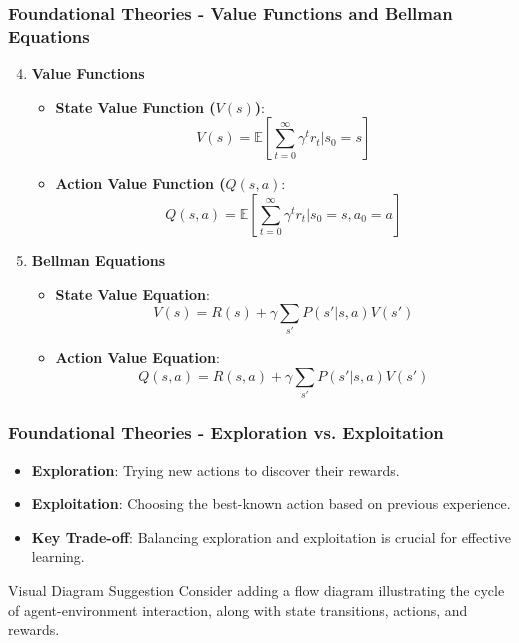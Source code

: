 \documentclass[aspectratio=169]{beamer}
\begin{document}
\begin{frame}[fragile]
    \frametitle{Foundational Theories - Value Functions and Bellman Equations}
    \begin{enumerate}
        \setcounter{enumi}{3}
        \item \textbf{Value Functions}
        \begin{itemize}
            \item \textbf{State Value Function (\(V(s)\))}:
            \[
            V(s) = \mathbb{E} \left[ \sum_{t=0}^{\infty} \gamma^t r_t | s_0 = s \right]
            \]
            \item \textbf{Action Value Function (\(Q(s, a)\)}:
            \[
            Q(s, a) = \mathbb{E} \left[ \sum_{t=0}^{\infty} \gamma^t r_t | s_0 = s, a_0 = a \right]
            \]
        \end{itemize}

        \item \textbf{Bellman Equations}
        \begin{itemize}
            \item \textbf{State Value Equation}:
            \[
            V(s) = R(s) + \gamma \sum_{s'} P(s' | s, a)V(s')
            \]
            \item \textbf{Action Value Equation}:
            \[
            Q(s, a) = R(s, a) + \gamma \sum_{s'} P(s' | s, a)V(s')
            \]
        \end{itemize}
    \end{enumerate}
\end{frame}

\begin{frame}[fragile]
    \frametitle{Foundational Theories - Exploration vs. Exploitation}
    \begin{itemize}
        \item \textbf{Exploration}: Trying new actions to discover their rewards.
        \item \textbf{Exploitation}: Choosing the best-known action based on previous experience.
        \item \textbf{Key Trade-off}: Balancing exploration and exploitation is crucial for effective learning.
    \end{itemize}
  
    \begin{block}{Visual Diagram Suggestion}
        Consider adding a flow diagram illustrating the cycle of agent-environment interaction, along with state transitions, actions, and rewards.
    \end{block}
\end{frame}
\end{document}
